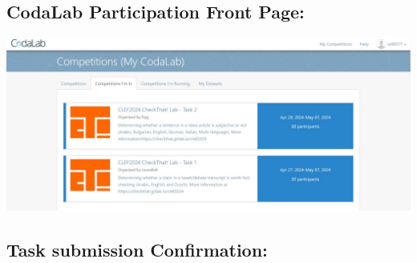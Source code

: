 \documentclass{article}
\begin{document}
\subsection{CodaLab Participation Front Page:}
\includegraphics[width=15cm]{CodaLabFrontPage.jpg}

\subsection{Task submission Confirmation:}
\end{document}
